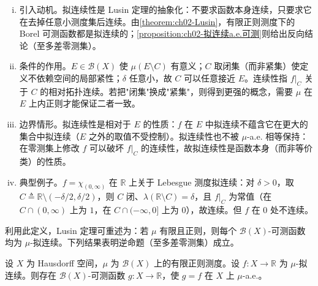 \documentclass[../../main.tex]{subfiles}%
\begin{document}
\begin{remark}\label{remark:ch02-拟连续}
\begin{enumerate}[(i)]
\item 引入动机。拟连续性是 Lusin 定理的抽象化：不要求函数本身连续，只要求它在去掉任意小测度集后连续。由\cref{theorem:ch02-Lusin}，有限正则测度下的 Borel 可测函数都是拟连续的；\cref{proposition:ch02-拟连续a.e.可测}则给出反向结论（至多差零测集）。
\item 条件的作用。$E\in\mathscr B(X)$ 使 $\mu(E\setminus C)$ 有意义；$C$ 取闭集（而非紧集）使定义不依赖空间的局部紧性；$\delta$ 任意小，故 $C$ 可以任意接近 $E$。连续性指 $f|_C$ 关于 $C$ 的相对拓扑连续。若把"闭集"换成"紧集"，则得到更强的概念，需要 $\mu$ 在 $E$ 上内正则才能保证二者一致。
\item 边界情形。拟连续性是相对于 $E$ 的性质：$f$ 在 $E$ 中拟连续不蕴含它在更大的集合中拟连续（$E$ 之外的取值不受控制）。拟连续性也不被 $\mu$-a.e. 相等保持：在零测集上修改 $f$ 可以破坏 $f|_C$ 的连续性，故拟连续性是函数本身（而非等价类）的性质。
\item 典型例子。$f=\chi_{(0,\infty)}$ 在 $\mathbb{R}$ 上关于 Lebesgue 测度拟连续：对 $\delta>0$，取 $C\triangleq\mathbb{R}\setminus(-\delta/2,\delta/2)$，则 $C$ 闭、$\lambda(\mathbb{R}\setminus C)=\delta$，且 $f|_C$ 为常值（在 $C\cap(0,\infty)$ 上为 $1$，在 $C\cap(-\infty,0]$ 上为 $0$），故连续。但 $f$ 在 $0$ 处不连续。
\end{enumerate}
\end{remark}

利用此定义，Lusin 定理可重述为：若 $\mu$ 有限且正则，则每个 $\mathscr B(X)$-可测函数均为 $\mu$-拟连续。下列结果表明逆命题（至多差零测集）成立。

\begin{proposition}\label{proposition:ch02-拟连续a.e.可测}
设 $X$ 为 Hausdorff 空间，$\mu$ 为 $\mathscr B(X)$ 上的有限正则测度。设 $f:X\to\mathbb{R}$ 为 $\mu$-拟连续。则存在 $\mathscr B(X)$-可测函数 $g:X\to\mathbb{R}$，使 $g=f$ 在 $X$ 上 $\mu$-a.e.。
\end{proposition}
\end{document}
